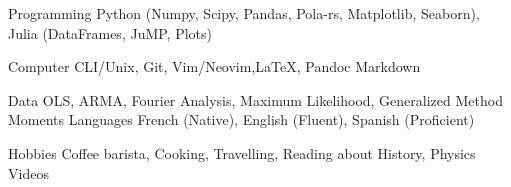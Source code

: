

\begin{cvskills}

	\cvskill
	{Programming} %
	{Python (Numpy, Scipy, Pandas, Pola-rs, Matplotlib, Seaborn), Julia (DataFrames, JuMP, Plots)}  %

	\cvskill
	{Computer}
	{CLI/Unix, Git, Vim/Neovim,\LaTeX, Pandoc Markdown}

	\cvskill
	{Data}
	{OLS, ARMA, Fourier Analysis, Maximum Likelihood, Generalized Method Moments}
	\cvskill
	{Languages} %
	{French (Native), English (Fluent), Spanish (Proficient)} %

	\cvskill
	{Hobbies}
	{Coffee barista, Cooking, Travelling, Reading about History, Physics Videos}
\end{cvskills}
